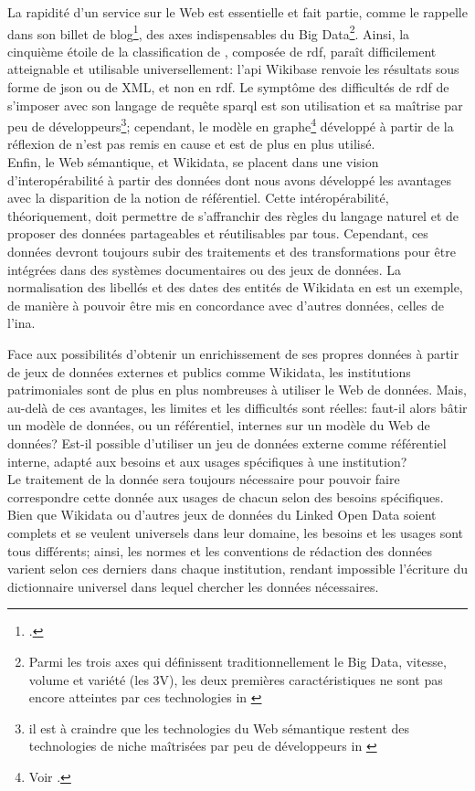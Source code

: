 La rapidité d'un service sur le Web est essentielle et fait partie, comme le rappelle  dans son billet de blog\footcite{poupeau_au-a_2018}, des axes indispensables du Big Data\footnote{\og Parmi les trois axes qui définissent traditionnellement le Big Data, vitesse, volume et variété (les \og 3V\fg{}), les deux premières caractéristiques ne sont pas encore atteintes par ces technologies\fg{} in \cite{poupeau_au-a_2018}}. Ainsi, la cinquième étoile de la classification de , composée de \ac{rdf}, paraît difficilement atteignable et utilisable universellement: l'\ac{api} Wikibase renvoie les résultats sous forme de \ac{json} ou de XML, et non en \ac{rdf}. Le symptôme des difficultés de \ac{rdf} de s'imposer avec son langage de requête \ac{sparql} est son utilisation et sa maîtrise par peu de développeurs\footnote{\og il est à craindre que les technologies du Web sémantique restent des technologies de niche maîtrisées par peu de développeurs\fg{} in \cite{poupeau_au-a_2018}}; cependant, le modèle en graphe\footnote{Voir .} développé à partir de la réflexion de  n'est pas remis en cause et est de plus en plus utilisé.\\

Enfin, le Web sémantique, et Wikidata, se placent dans une vision d'interopérabilité à partir des données dont nous avons développé les avantages avec la disparition de la notion de référentiel. Cette intéropérabilité, théoriquement, doit permettre de s'affranchir des règles du langage naturel et de proposer des données partageables et réutilisables par tous. Cependant, ces données devront toujours subir des traitements et des transformations pour être intégrées dans des systèmes documentaires ou des jeux de données. La normalisation des libellés et des dates des entités de Wikidata en est un exemple, de manière à pouvoir être mis en concordance avec d'autres données, celles de l'\ac{ina}.

\bigskip
\bigskip
Face aux possibilités d'obtenir un enrichissement de ses propres données à partir de jeux de données externes et publics comme Wikidata, les institutions patrimoniales sont de plus en plus nombreuses à utiliser le Web de données. Mais, au-delà de ces avantages, les limites et les difficultés sont réelles: faut-il alors bâtir un modèle de données, ou un référentiel, internes sur un modèle du Web de données? Est-il possible d'utiliser un jeu de données externe comme référentiel interne, adapté aux besoins et aux usages spécifiques à une institution?\\

Le traitement de la donnée sera toujours nécessaire pour pouvoir faire correspondre cette donnée aux usages de chacun selon des besoins spécifiques. Bien que Wikidata ou d'autres jeux de données du Linked Open Data soient complets et se veulent universels dans leur domaine, les besoins et les usages sont tous différents; ainsi, les normes et les conventions de rédaction des données varient selon ces derniers dans chaque institution, rendant impossible l'écriture du dictionnaire universel dans lequel chercher les données nécessaires.